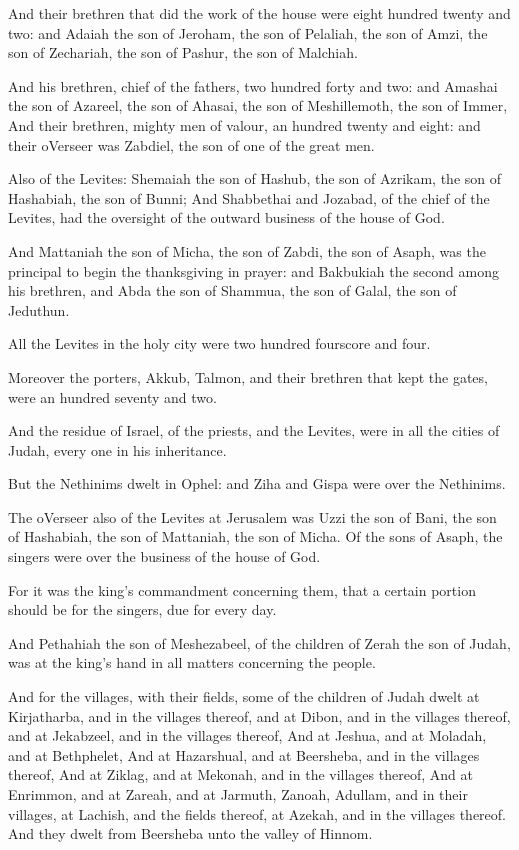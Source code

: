 \Verse And their brethren that did the work of the house were eight hundred twenty and two: and Adaiah the son of Jeroham, the son of Pelaliah, the son of Amzi, the son of Zechariah, the son of Pashur, the son of Malchiah.

\Verse And his brethren, chief of the fathers, two hundred forty and two: and Amashai the son of Azareel, the son of Ahasai, the son of Meshillemoth, the son of Immer, \Verse And their brethren, mighty men of valour, an hundred twenty and eight: and their oVerseer was Zabdiel, the son of one of the great men.

\Verse Also of the Levites: Shemaiah the son of Hashub, the son of Azrikam, the son of Hashabiah, the son of Bunni; \Verse And Shabbethai and Jozabad, of the chief of the Levites, had the oversight of the outward business of the house of God.

\Verse And Mattaniah the son of Micha, the son of Zabdi, the son of Asaph, was the principal to begin the thanksgiving in prayer: and Bakbukiah the second among his brethren, and Abda the son of Shammua, the son of Galal, the son of Jeduthun.

\Verse All the Levites in the holy city were two hundred fourscore and four.

\Verse Moreover the porters, Akkub, Talmon, and their brethren that kept the gates, were an hundred seventy and two.

\Verse And the residue of Israel, of the priests, and the Levites, were in all the cities of Judah, every one in his inheritance.

\Verse But the Nethinims dwelt in Ophel: and Ziha and Gispa were over the Nethinims.

\Verse The oVerseer also of the Levites at Jerusalem was Uzzi the son of Bani, the son of Hashabiah, the son of Mattaniah, the son of Micha.  Of the sons of Asaph, the singers were over the business of the house of God.

\Verse For it was the king's commandment concerning them, that a certain portion should be for the singers, due for every day.

\Verse And Pethahiah the son of Meshezabeel, of the children of Zerah the son of Judah, was at the king's hand in all matters concerning the people.

\Verse And for the villages, with their fields, some of the children of Judah dwelt at Kirjatharba, and in the villages thereof, and at Dibon, and in the villages thereof, and at Jekabzeel, and in the villages thereof, \Verse And at Jeshua, and at Moladah, and at Bethphelet, \Verse And at Hazarshual, and at Beersheba, and in the villages thereof, \Verse And at Ziklag, and at Mekonah, and in the villages thereof, \Verse And at Enrimmon, and at Zareah, and at Jarmuth, \Verse Zanoah, Adullam, and in their villages, at Lachish, and the fields thereof, at Azekah, and in the villages thereof. And they dwelt from Beersheba unto the valley of Hinnom.

